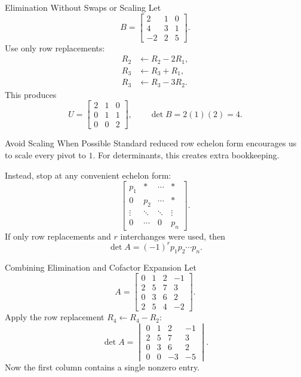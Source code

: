 \begin{frame}{Elimination Without Swaps or Scaling}
Let
\[
B=\begin{bmatrix}
2&1&0\\
4&3&1\\
-2&2&5
\end{bmatrix}.
\]
Use only row replacements:
\[
\begin{aligned}
R_2&\leftarrow R_2-2R_1,\\
R_3&\leftarrow R_3+R_1,\\
R_3&\leftarrow R_3-3R_2.
\end{aligned}
\]
\pause
This produces
\[
U=\begin{bmatrix}2&1&0\\0&1&1\\0&0&2\end{bmatrix},
\qquad
\boxed{\det B=2(1)(2)=4}.
\]
\end{frame}

\begin{frame}{Avoid Scaling When Possible}
Standard reduced row echelon form encourages us to scale every pivot to $1$.
For determinants, this creates extra bookkeeping.
\pause

Instead, stop at any convenient echelon form:
\[
\begin{bmatrix}
p_1&*&\cdots&*\\
0&p_2&\cdots&*\\
\vdots&\ddots&\ddots&\vdots\\
0&\cdots&0&p_n
\end{bmatrix}.
\]
\pause
If only row replacements and $r$ interchanges were used, then
\[
\boxed{\det A=(-1)^r p_1p_2\cdots p_n}.
\]
\end{frame}

\begin{frame}{Combining Elimination and Cofactor Expansion}
Let
\[
A=\begin{bmatrix}
0&1&2&-1\\
2&5&7&3\\
0&3&6&2\\
2&5&4&-2
\end{bmatrix}.
\]
Apply the row replacement $R_4\leftarrow R_4-R_2$:
\[
\det A=
\begin{vmatrix}
0&1&2&-1\\
2&5&7&3\\
0&3&6&2\\
0&0&-3&-5
\end{vmatrix}.
\]
\pause
Now the first column contains a single nonzero entry.
\end{frame}

